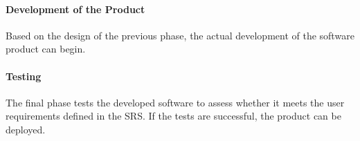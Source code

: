 \paragraph{Development of the Product}
Based on the design of the previous phase, the actual development of the software product can begin.

\paragraph{Testing}
The final phase tests the developed software to assess whether it meets the user requirements defined in the SRS. If the tests are successful, the product can be deployed.






